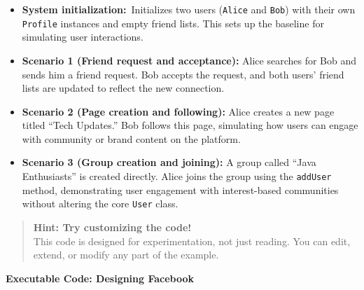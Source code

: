 \begin{itemize}
\item
\protect{}\label{lZSH5-mzHIs8g6dW6Lcxy}
\textbf{System initialization:}~Initializes two users (\texttt{Alice} and \texttt{Bob}) with their own \texttt{Profile} instances and empty friend lists. This sets up the baseline for simulating user interactions.
\item
\protect{}\label{Bj-rjzM7H9hSbNYXd1CAU}
\textbf{Scenario 1 (Friend request and acceptance):} Alice searches for Bob and sends him a friend request. Bob accepts the request, and both users' friend lists are updated to reflect the new connection.
\item
\protect{}\label{QDaOr_ClfBb-eqXXd2527}
\textbf{Scenario 2 (Page creation and following):} Alice creates a new page titled ``Tech Updates.'' Bob follows this page, simulating how users can engage with community or brand content on the platform.
\item
\protect{}\label{O7o2T6NduMuHyEo1DAlqH}
\textbf{Scenario 3 (Group creation and joining):} A group called ``Java Enthusiasts'' is created directly. Alice joins the group using the \texttt{addUser} method, demonstrating user engagement with interest-based communities without altering the core \texttt{User} class.
\end{itemize}
\begin{quote}
\textbf{Hint: Try customizing the code!}\\
This code is designed for experimentation, not just reading. You can edit, extend, or modify any part of the example.
\end{quote}

\textbf{Executable Code: Designing Facebook}

